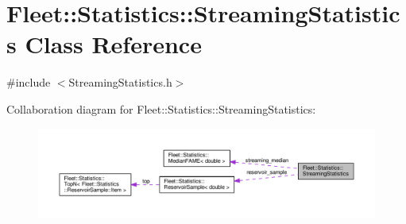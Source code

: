 \hypertarget{class_fleet_1_1_statistics_1_1_streaming_statistics}{}\section{Fleet\+:\+:Statistics\+:\+:Streaming\+Statistics Class Reference}
\label{class_fleet_1_1_statistics_1_1_streaming_statistics}


{\ttfamily \#include $<$Streaming\+Statistics.\+h$>$}



Collaboration diagram for Fleet\+:\+:Statistics\+:\+:Streaming\+Statistics\+:
\nopagebreak
\begin{figure}[H]
\begin{center}
\leavevmode
\includegraphics[width=350pt]{class_fleet_1_1_statistics_1_1_streaming_statistics__coll__graph}
\end{center}
\end{figure}
